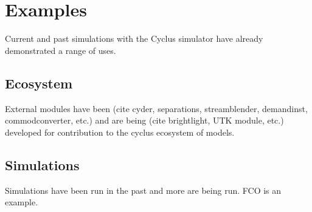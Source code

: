 \section{Examples}
%

%


Current and past simulations with the Cyclus simulator have already 
demonstrated a range of uses. 

\subsection{Ecosystem}


External modules have been (cite cyder, separations, streamblender, demandinst, 
commodconverter, etc.) and are being (cite brightlight, UTK module, etc.) 
developed for contribution to the cyclus ecosystem of models. 


\subsection{Simulations}

Simulations have been run in the past and more are being run. FCO is an 
example. 
